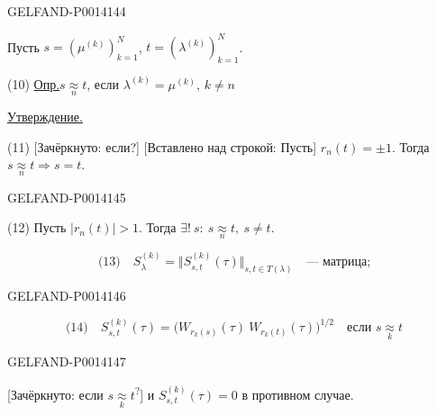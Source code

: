 \begin{GelfandAdjacentEvidence}{GELFAND-P001414}{4}


Пусть \(s=(\mu^{(k)})_{k=1}^{N}\), \quad \(t=(\lambda^{(k)})_{k=1}^{N}\).

(10) \uline{Опр.}\quad \(s\underset{n}{\approx}t\), если
\(\lambda^{(k)}=\mu^{(k)}\), \(k\ne n\)

\uline{Утверждение.}

(11) [Зачёркнуто: если?] [Вставлено над строкой: Пусть] \(r_n(t)=\pm1\).
Тогда \(s\underset{n}{\approx}t\Rightarrow s=t\).
\end{GelfandAdjacentEvidence}
\begin{GelfandAdjacentEvidence}{GELFAND-P001414}{5}


(12) Пусть \(|r_n(t)|>1\). Тогда
\(\exists!\ s:\ s\underset{n}{\approx}t,\ s\ne t\).

\[
\text{(13)}\quad S_\lambda^{(k)}=\Vert S_{s,t}^{(k)}(\tau)\Vert_{s,t\in T(\lambda)}
\quad\text{— матрица;}
\]
\end{GelfandAdjacentEvidence}
\begin{GelfandAdjacentEvidence}{GELFAND-P001414}{6}


\[
\text{(14)}\quad
S_{s,t}^{(k)}(\tau)=\bigl(W_{r_k(s)}(\tau)\ W_{r_k(t)}(\tau)\bigr)^{1/2}
\quad\text{если }s\underset{k}{\approx}t
\]
\end{GelfandAdjacentEvidence}
\begin{GelfandAdjacentEvidence}{GELFAND-P001414}{7}


[Зачёркнуто: если \(s\underset{k}{\approx}t\)\textsuperscript{?}]
и \(S_{s,t}^{(k)}(\tau)=0\) в противном случае.
\end{GelfandAdjacentEvidence}



